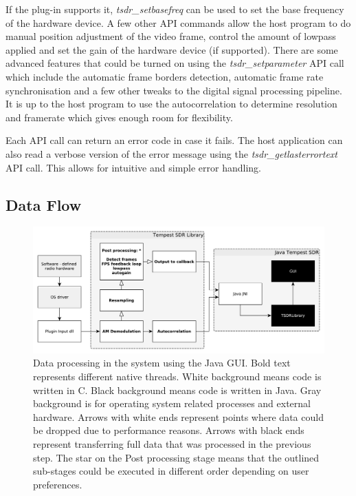 \documentclass[a4paper,12pt,twoside,openright]{report}
\begin{document}
If the plug-in supports it, \textit{tsdr\_setbasefreq} can be used to set the base frequency of the hardware device. A few other API commands allow the host program to do manual position adjustment of the video frame, control the amount of lowpass applied and set the gain of the hardware device (if supported). There are some advanced features that could be turned on using the \textit{tsdr\_setparameter} API call which include the automatic frame borders detection, automatic frame rate synchronisation and a few other tweaks to the digital signal processing pipeline. It is up to the host program to use the autocorrelation to determine resolution and framerate which gives enough room for flexibility.

Each API call can return an error code in case it fails. The host application can also read a verbose version of the error message using the \textit{tsdr\_getlasterrortext} API call. This allows for intuitive and simple error handling.

\subsection{Data Flow}

\begin{figure}[h]
  \centering
    \includegraphics[width=\textwidth]{systemoverview}
    \caption{Data processing in the system using the Java GUI. Bold text represents different native threads. White background means code is written in C. Black background means code is written in Java. Gray background is for operating system related processes and external hardware. Arrows with white ends represent points where data could be dropped due to performance reasons. Arrows with black ends represent transferring full data that was processed in the previous step. The star on the Post processing stage means that the outlined sub-stages could be executed in different order depending on user preferences.}
    \label{fig:architecture}
\end{figure}
\end{document}
